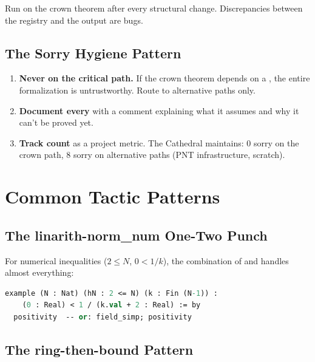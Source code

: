 \documentclass[11pt,a4paper]{article}
\begin{document}
Run  on the crown theorem after every
structural change. Discrepancies between the registry and the
output are bugs.

\subsection{The Sorry Hygiene Pattern}

\begin{enumerate}
  \item \textbf{Never  on the critical path.} If the
    crown theorem depends on a , the entire formalization
    is untrustworthy. Route  to alternative paths only.
  \item \textbf{Document every } with a comment explaining
    what it assumes and why it can't be proved yet.
  \item \textbf{Track  count} as a project metric.
    The Cathedral maintains: 0 sorry on the crown path,
    8 sorry on alternative paths (PNT infrastructure, scratch).
\end{enumerate}

\section{Common Tactic Patterns}
\label{sec:tactics}

\subsection{The linarith-norm\_num One-Two Punch}

For numerical inequalities ($2 \leq N$, $0 < 1/k$), the combination
of  and  handles almost everything:

\begin{lstlisting}[language=ML,caption={Numerical inequality dispatch}]
example (N : Nat) (hN : 2 <= N) (k : Fin (N-1)) :
    (0 : Real) < 1 / (k.val + 2 : Real) := by
  positivity  -- or: field_simp; positivity
\end{lstlisting}

\subsection{The ring-then-bound Pattern}
\end{document}
